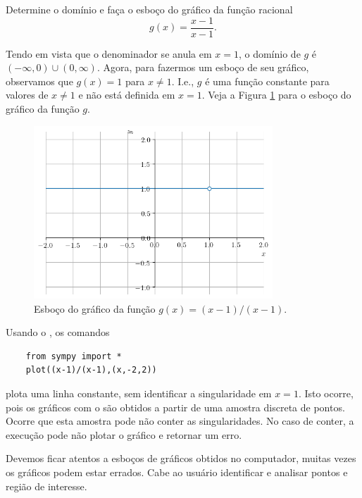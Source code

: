 \begin{exeresol}
  Determine o domínio e faça o esboço do gráfico da função racional
  \begin{equation}
    g(x) = \frac{x-1}{x-1}.
  \end{equation}
\end{exeresol}
\begin{resol}
  Tendo em vista que o denominador se anula em $x=1$, o domínio de $g$ é $(-\infty, 0)\cup (0, \infty)$. Agora, para fazermos um esboço de seu gráfico, observamos que $g(x)=1$ para $x\neq 1$. I.e., $g$ é uma função constante para valores de $x\neq 1$ e não está definida em $x=1$. Veja a Figura \ref{fig:exeresol_funracio_graf} para o esboço do gráfico da função $g$.

  \begin{figure}[H]
    \centering
    \includegraphics[width=0.8\textwidth]{./cap_funcao/dados/fig_exeresol_funracio_graf/fig_exeresol_funracio_graf}
    \caption{Esboço do gráfico da função $g(x) = (x-1)/(x-1)$.}
    \label{fig:exeresol_funracio_graf}
  \end{figure}

  \ifispython
  Usando o {\sympy}, os comandos
  \begin{lstlisting}
    from sympy import *
    plot((x-1)/(x-1),(x,-2,2))
  \end{lstlisting}
  plota uma linha constante, sem identificar a singularidade em $x=1$. Isto ocorre, pois os gráficos com o {\sympy} são obtidos a partir de uma amostra discreta de pontos. Ocorre que esta amostra pode não conter as singularidades. No caso de conter, a execução pode não plotar o gráfico e retornar um erro.

  Devemos ficar atentos a esboços de gráficos obtidos no computador, muitas vezes os gráficos podem estar errados. Cabe ao usuário identificar e analisar pontos e região de interesse.
  \fi
\end{resol}

